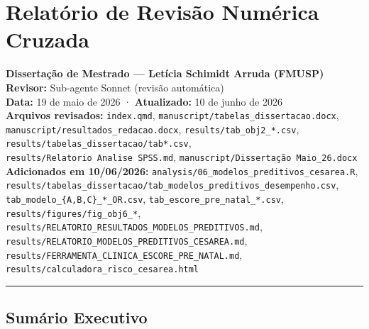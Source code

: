 \documentclass[
]{article}
\author{}
\date{}
\begin{document}
\hypertarget{relatuxf3rio-de-revisuxe3o-numuxe9rica-cruzada}{%
\section{Relatório de Revisão Numérica
Cruzada}\label{relatuxf3rio-de-revisuxe3o-numuxe9rica-cruzada}}

\textbf{Dissertação de Mestrado --- Letícia Schimidt Arruda (FMUSP)}\\
\textbf{Revisor:} Sub-agente Sonnet (revisão automática)\\
\textbf{Data:} 19 de maio de 2026 · \textbf{Atualizado:} 10 de junho de
2026\\
\textbf{Arquivos revisados:} \texttt{index.qmd},
\texttt{manuscript/tabelas\_dissertacao.docx},
\texttt{manuscript/resultados\_redacao.docx},
\texttt{results/tab\_obj2\_*.csv},
\texttt{results/tabelas\_dissertacao/tab*.csv},
\texttt{results/Relatorio\ Analise\ SPSS.md},
\texttt{manuscript/Dissertação\ Maio\_26.docx} \textbf{Adicionados em
10/06/2026:} \texttt{analysis/06\_modelos\_preditivos\_cesarea.R},
\texttt{results/tabelas\_dissertacao/tab\_modelos\_preditivos\_desempenho.csv},
\texttt{tab\_modelo\_\{A,B,C\}\_*\_OR.csv},
\texttt{tab\_escore\_pre\_natal\_*.csv},
\texttt{results/figures/fig\_obj6\_*},
\texttt{results/RELATORIO\_RESULTADOS\_MODELOS\_PREDITIVOS.md},
\texttt{results/RELATORIO\_MODELOS\_PREDITIVOS\_CESAREA.md},
\texttt{results/FERRAMENTA\_CLINICA\_ESCORE\_PRE\_NATAL.md},
\texttt{results/calculadora\_risco\_cesarea.html}

\begin{center}\rule{0.5\linewidth}{0.5pt}\end{center}

\hypertarget{sumuxe1rio-executivo}{%
\subsection{Sumário Executivo}\label{sumuxe1rio-executivo}}
\end{document}
